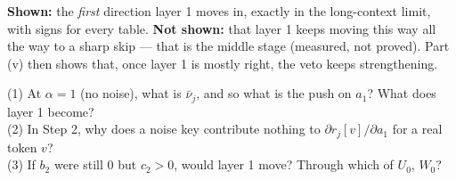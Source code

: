 \documentclass[11pt]{article}
\newcommand{\1}{\mathbf{1}}
\begin{document}
\begin{caveat}
\textbf{Shown:} the \emph{first} direction layer 1 moves in, exactly in the long-context limit, with signs for every
table. \textbf{Not shown:} that layer 1 keeps moving this way all the way to a sharp skip --- that is the middle stage
(measured, not proved). Part (v) then shows that, once layer 1 is mostly right, the veto keeps strengthening.
\end{caveat}

\begin{quickcheck}
(1) At $\alpha=1$ (no noise), what is $\bar\nu_j$, and so what is the push on $a_1$? What does layer 1 become?\\
(2) In Step 2, why does a noise key contribute nothing to $\partial r_j[v]/\partial a_1$ for a real token $v$?\\
(3) If $b_2$ were still $0$ but $c_2>0$, would layer 1 move? Through which of $U_0$, $W_0$?
\end{quickcheck}
\end{document}
